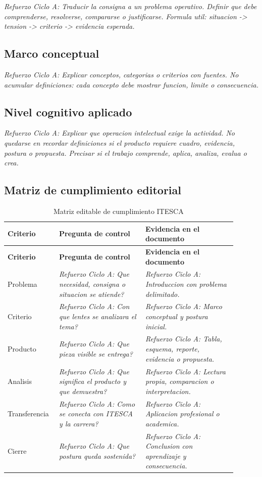 \documentclass[
	spanish,
	letterpaper, oneside
]{article}
\begin{document}
\textit{Refuerzo Ciclo A: Traducir la consigna a un problema operativo. Definir que debe comprenderse, resolverse, compararse o justificarse. Formula util: situacion -> tension -> criterio -> evidencia esperada.}

\subsection{Marco conceptual}

\textit{Refuerzo Ciclo A: Explicar conceptos, categorias o criterios con fuentes. No acumular definiciones: cada concepto debe mostrar funcion, limite o consecuencia.}

\subsection{Nivel cognitivo aplicado}

\textit{Refuerzo Ciclo A: Explicar que operacion intelectual exige la actividad. No quedarse en recordar definiciones si el producto requiere cuadro, evidencia, postura o propuesta. Precisar si el trabajo comprende, aplica, analiza, evalua o crea.}

\subsection{Matriz de cumplimiento editorial}

\begin{longtable}{@{}p{0.18\linewidth}p{0.35\linewidth}p{0.37\linewidth}@{}}
	\caption{Matriz editable de cumplimiento ITESCA}\label{tab:matriz-cumplimiento-itesca}\\
	\toprule
	\textbf{Criterio} & \textbf{Pregunta de control} & \textbf{Evidencia en el documento} \\
	\midrule
	\endfirsthead
	\toprule
	\textbf{Criterio} & \textbf{Pregunta de control} & \textbf{Evidencia en el documento} \\
	\midrule
	\endhead
	Problema & \textit{Refuerzo Ciclo A: Que necesidad, consigna o situacion se atiende?} & \textit{Refuerzo Ciclo A: Introduccion con problema delimitado.} \\
	Criterio & \textit{Refuerzo Ciclo A: Con que lentes se analizara el tema?} & \textit{Refuerzo Ciclo A: Marco conceptual y postura inicial.} \\
	Producto & \textit{Refuerzo Ciclo A: Que pieza visible se entrega?} & \textit{Refuerzo Ciclo A: Tabla, esquema, reporte, evidencia o propuesta.} \\
	Analisis & \textit{Refuerzo Ciclo A: Que significa el producto y que demuestra?} & \textit{Refuerzo Ciclo A: Lectura propia, comparacion o interpretacion.} \\
	Transferencia & \textit{Refuerzo Ciclo A: Como se conecta con ITESCA y la carrera?} & \textit{Refuerzo Ciclo A: Aplicacion profesional o academica.} \\
	Cierre & \textit{Refuerzo Ciclo A: Que postura queda sostenida?} & \textit{Refuerzo Ciclo A: Conclusion con aprendizaje y consecuencia.} \\
	\bottomrule
\end{longtable}
\end{document}
